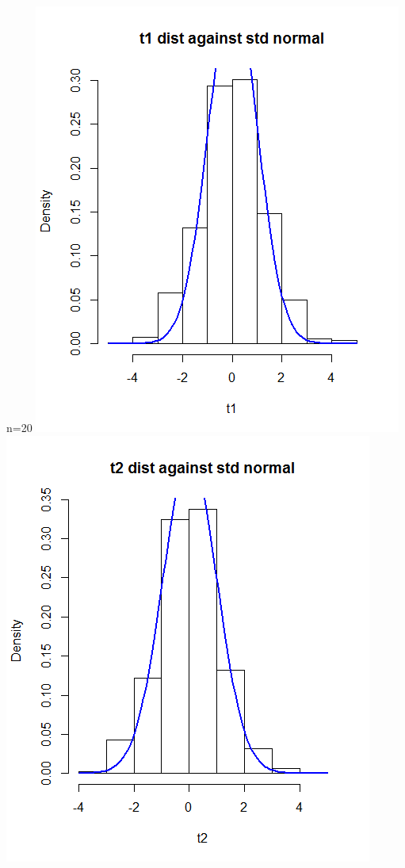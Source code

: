 \documentclass{article}
\begin{document}
\begin{enumerate}
\begin{enumerate}
\begin{center}
							\newline
							n=20 \newline
							 \includegraphics[scale=.5]{t1_20}
								 \includegraphics[scale=.5]{t2_20}

\end{center}
\end{enumerate}
\end{enumerate}
\end{document}
